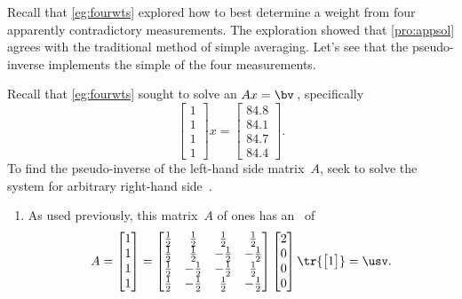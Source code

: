 \begin{reduce}
\begin{example}  
Recall that \cref{eg:fourwts} explored how to best determine a  weight from four apparently contradictory measurements.
The exploration showed that \cref{pro:appsol} agrees with the traditional method of simple averaging.
Let's see that the pseudo-inverse implements the simple  of the four measurements.

Recall that \cref{eg:fourwts} sought to solve an  \(Ax=\bv\)\,, specifically
\begin{equation*}
\begin{bmatrix} 1\\1\\1\\1 \end{bmatrix}x
=\begin{bmatrix} 84.8\\84.1\\84.7\\84.4 \end{bmatrix}.
\end{equation*}
To find the pseudo-inverse of the left-hand side matrix~\(A\), seek to solve the system for arbitrary right-hand side~\bv.
\begin{enumerate}
\item As used previously, this matrix~\(A\) of ones has an \svd\ of
\def\h{\frac12}
\begin{equation*}
A=\begin{bmatrix} 1\\1\\1\\1 \end{bmatrix}
=\begin{bmatrix} \h&\h&\h&\h
\\\h&\h&-\h&-\h
\\\h&-\h&-\h&\h
\\\h&-\h&\h&-\h \end{bmatrix}
\begin{bmatrix} 2\\0\\0\\0 \end{bmatrix}
\tr{\begin{bmatrix} 1 \end{bmatrix}}
=\usv.
\end{equation*}


\end{enumerate}
\end{example}
\end{reduce}

